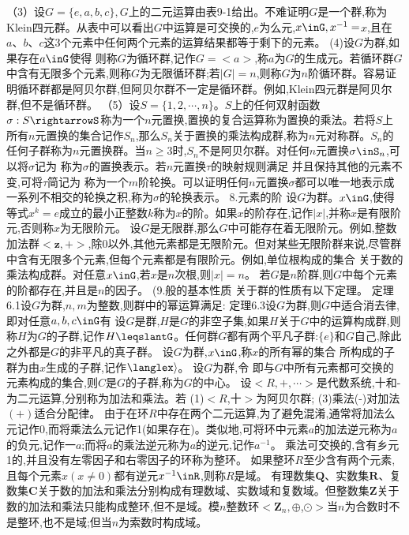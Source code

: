 （3）设$G=\{e,a,b,c\},G$上的二元运算由表9-1给出。不难证明$G$是一个群,称为Klein四元群。从表中可以看出$G$中运算是可交换的,$e$为么元,$x\inG,x^{-1}=$$x$,且在$a、b、c$这3个元素中任何两个元素的运算结果都等于剩下的元素。
(4)设$G$为群,如果存在$a\inG$使得
则称$G$为循环群,记作$G=<a>$,称$a$为$G$的生成元。若循环群$G$中含有无限多个元素,则称$G$为无限循环群;若$|G|=n$,则称$G$为$n$阶循环群。容易证明循环群都是阿贝尔群,但阿贝尔群不一定是循环群。例如,Klein四元群是阿贝尔群,但不是循环群。
（5）设$S=\{1,2,\cdots,n\}。S$上的任何双射函数$\sigma:S\rightarrowS$称为一个$n$元置换,置换的复合运算称为置换的乘法。若将$S$上所有$n$元置换的集合记作$S_{n}$,那么$S_{n}$关于置换的乘法构成群,称为$n$元对称群。$S_{n}$的任何子群称为$n$元置换群。当$n\geqslant3$时,$S_{n}$不是阿贝尔群。对任何$n$元置换$\sigma\inS_{n}$,可以将$\sigma$记为
称为$\sigma$的置换表示。若$n$元置换$\tau$的映射规则满足
并且保持其他的元素不变,可将$\tau$简记为
称为一个$m$阶轮换。可以证明任何$n$元置换$\sigma$都可以唯一地表示成一系列不相交的轮换之积,称为$\sigma$的轮换表示。
{8.元素的阶}
设$G$为群。$x\inG$,使得等式$x^{k}=e$成立的最小正整数$k$称为$x$的阶。如果$x$的阶存在,记作$|x|$,并称$x$是有限阶元,否则称$x$为无限阶元。
设$G$是无限群,那么$G$中可能存在着无限阶元。例如,整数加法群$<\mathbf{z},+>$,除0以外,其他元素都是无限阶元。但对某些无限阶群来说,尽管群中含有无限多个元素,但每个元素都是有限阶元。例如,单位根构成的集合
关于数的乘法构成群。对任意$x\inG$,若$x$是$n$次根,则$|x|=n$。
若$G$是$n$阶群,则$G$中每个元素的阶都存在,并且是$n$的因子。
{(9.般的基本性质}
关于群的性质有以下定理。
定理6.1设$G$为群,$n,m$为整数,则群中的幂运算满足:
定理6.3设$G$为群,则$G$中适合消去律,即对任意$a,b,c\inG$有
设$G$是群,$H$是$G$的非空子集,如果$H$关于$G$中的运算构成群,则称$H$为$G$的子群,记作$H\leqslantG$。任何群$G$都有两个平凡子群:$\{e\}$和$G$自己,除此之外都是$G$的非平凡的真子群。
设$G$为群,$x\inG$,称$x$的所有幂的集合
所构成的子群为由$x$生成的子群,记作$\langlex\rangle$。
设$G$为群,令
即与$G$中所有元素都可交换的元素构成的集合,则$C$是$G$的子群,称为$G$的中心。
设$<R,+,\cdots>$是代数系统,十和-为二元运算,分别称为加法和乘法。若
(1)$<R$,十$>$为阿贝尔群;
(3)乘法(-)对加法$(+)$适合分配律。
由于在环$R$中存在两个二元运算,为了避免混淆,通常将加法么元记作0,而将乘法么元记作1(如果存在)。类似地,可将环中元素$a$的加法逆元称为$a$的负元,记作一$a$;而将$a$的乘法逆元称为$a$的逆元,记作$a^{-1}$。
乘法可交换的,含有乡元1的,并且没有左零因子和右零因子的环称为整环。
如果整环$R$至少含有两个元素,且每个元素$x(x\neq0)$都有逆元$x^{-1}\inR$,则称$R$是域。
有理数集$\mathbf{Q}$、实数集$\mathbf{R}$、复数集$\mathbf{C}$关于数的加法和乘法分别构成有理数域、实数域和复数域。但整数集$\mathbf{Z}$关于数的加法和乘法只能构成整环,但不是域。模$n$整数环$<\mathbf{Z}_{n},\oplus$,$\odot>$当$n$为合数时不是整环,也不是域;但当$n$为索数时构成域。
$$
